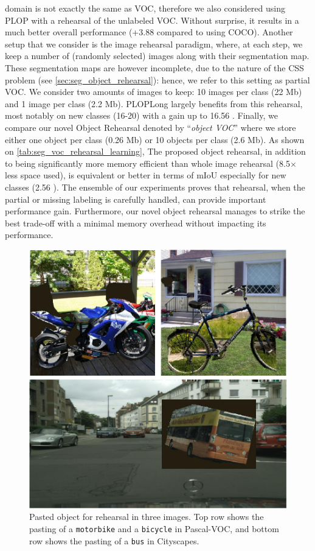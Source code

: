 domain is not exactly the same as VOC, therefore we also considered using PLOP with a rehearsal of
the unlabeled VOC. Without surprise, it results in a much better overall performance (+3.88
\pp compared to using COCO). Another setup that we consider is the image rehearsal
paradigm, where, at each step, we keep a number of (randomly selected) images along with their
segmentation map. These segmentation maps are however incomplete, due to the nature of the \ac{CSS}
problem (see \autoref{sec:seg_object_rehearsal}): hence, we refer to this setting as partial VOC. We
consider two amounts of images to keep: 10 images per class (22 Mb) and 1 image per class (2.2 Mb).
PLOPLong largely benefits from this rehearsal, most notably on new classes (16-20) with a gain up to
16.56 \pp. Finally, we compare our novel Object Rehearsal denoted by ``\textit{object
    VOC}'' where we store either one object per class (0.26 Mb) or 10 objects per class (2.6 Mb). As
shown on \autoref{tab:seg_voc_rehearsal_learning}, The proposed object rehearsal, in addition to
being significantly more memory efficient than whole image rehearsal (8.5$\times$ less space used),
is equivalent or better in terms of \ac{mIoU} especially for new classes (2.56 \pp). The
ensemble of our experiments proves that rehearsal, when the partial or missing labeling is carefully
handled, can provide important performance gain. Furthermore, our novel object rehearsal manages to
strike the best trade-off with a minimal memory overhead without impacting its performance.

\begin{figure}
    \centering
    \includegraphics[width=\linewidth]{images/seg/object_pasting.pdf}
    \caption{Pasted object for rehearsal in three images. Top row shows the pasting of a
        \texttt{motorbike} and a \texttt{bicycle} in Pascal-VOC, and bottom row shows the pasting of
        a \texttt{bus} in Cityscapes.}
    \label{fig:seg_object_pasting}
\end{figure}

